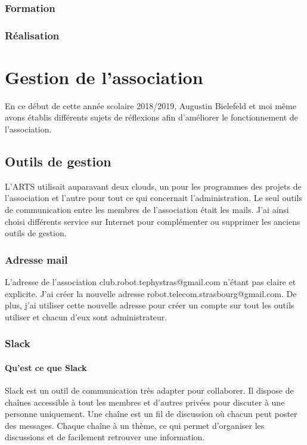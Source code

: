 \documentclass[12pt,a4paper]{report}
\begin{document}
    \subsection{Formation}
    \subsection{Réalisation}

\chapter{Gestion de l'association}
  En ce début de cette année scolaire 2018/2019, Augustin Bielefeld et moi même avons établis différents sujets de réflexions afin d'améliorer le fonctionnement de l'association.

  \section{Outils de gestion}
    L'ARTS utilisait auparavant deux clouds, un pour les programmes des projets de l'association et l'autre pour tout ce qui concernait l'administration.
    Le seul outils de communication entre les membres de l'association était les mails.
    J'ai ainsi choisi différents service sur Internet pour complémenter ou supprimer les anciens outils de gestion.

    \subsection{Adresse mail}
      L'adresse de l'association club.robot.tephystras@gmail.com n'étant pas claire et explicite. J'ai créer la nouvelle adresse robot.telecom.strasbourg@gmail.com.
      De plus, j'ai utiliser cette nouvelle adresse pour créer un compte sur tout les outils utiliser et chacun d'eux sont administrateur.

    \subsection{Slack}
      \subsubsection{Qu'est ce que Slack}
        Slack est un outil de communication très adapter pour collaborer. Il dispose de chaînes accessible à tout les membres et d'autres privées pour discuter à une personne uniquement. Une chaîne est un fil de discussion où chacun peut poster des messages. Chaque chaîne à un thème, ce qui permet d'organiser les discussions et de facilement retrouver une information.
\end{document}
